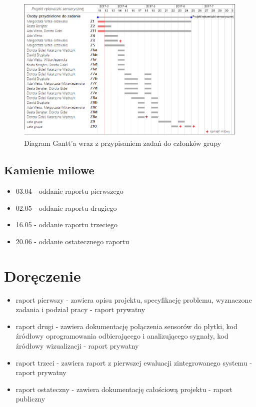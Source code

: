 \documentclass{article}
\begin{document}
\begin{figure}[h!]
\centering
\includegraphics[scale=0.8]{projekt-rekawiczki-sensorycznej-gantt.png}
\caption{Diagram Gantt'a wraz z przypisaniem zadań do członków grupy}
\label{fig:projekt-rekawiczki-sensorycznej-gantt}
\end{figure}
\subsection{Kamienie milowe}
\begin{itemize}
\item 03.04 - oddanie raportu pierwszego
\item 02.05 - oddanie raportu drugiego
\item 16.05 - oddanie raportu trzeciego
\item 20.06 - oddanie ostatecznego raportu
\end{itemize}


\section{Doręczenie}
\begin{itemize}
\item raport pierwszy -  zawiera opisu projektu, specyfikację problemu, wyznaczone zadania i podział pracy - raport prywatny
\item raport drugi - zawiera dokumentację połączenia sensorów do płytki, kod źródłowy oprogramowania odbierającego i analizującego sygnały, kod źródłowy wizualizacji - raport prywatny
\item raport trzeci - zawiera raport z pierwszej ewaluacji zintegrowanego systemu - raport prywatny
\item raport ostateczny - zawiera dokumentację całościową projektu - raport publiczny
\end{itemize}
\end{document}
